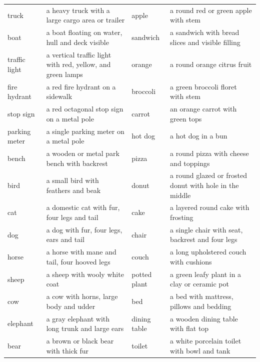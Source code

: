 \begin{table}[p]
{\begin{tabular}{@{}p{}p{}p{}p{}@{}}
truck          & a heavy truck with a large cargo area or trailer          & apple          & a round red or green apple with stem \\
boat           & a boat floating on water, hull and deck visible           & sandwich       & a sandwich with bread slices and visible filling \\
traffic light  & a vertical traffic light with red, yellow, and green lamps & orange        & a round orange citrus fruit \\
fire hydrant   & a red fire hydrant on a sidewalk                          & broccoli       & a green broccoli floret with stem \\
stop sign      & a red octagonal stop sign on a metal pole                 & carrot         & an orange carrot with green tops \\
parking meter  & a single parking meter on a metal pole                    & hot dog        & a hot dog in a bun \\
bench          & a wooden or metal park bench with backrest                & pizza          & a round pizza with cheese and toppings \\
bird           & a small bird with feathers and beak                       & donut          & a round glazed or frosted donut with hole in the middle \\
cat            & a domestic cat with fur, four legs and tail               & cake           & a layered round cake with frosting \\
dog            & a dog with fur, four legs, ears and tail                  & chair          & a single chair with seat, backrest and four legs \\
horse          & a horse with mane and tail, four hooved legs              & couch          & a long upholstered couch with cushions \\
sheep          & a sheep with wooly white coat                             & potted plant   & a green leafy plant in a clay or ceramic pot \\
cow            & a cow with horns, large body and udder                    & bed            & a bed with mattress, pillows and bedding \\
elephant       & a gray elephant with long trunk and large ears            & dining table   & a wooden dining table with flat top \\
bear           & a brown or black bear with thick fur                      & toilet         & a white porcelain toilet with bowl and tank \\

\end{tabular}}
\end{table}
